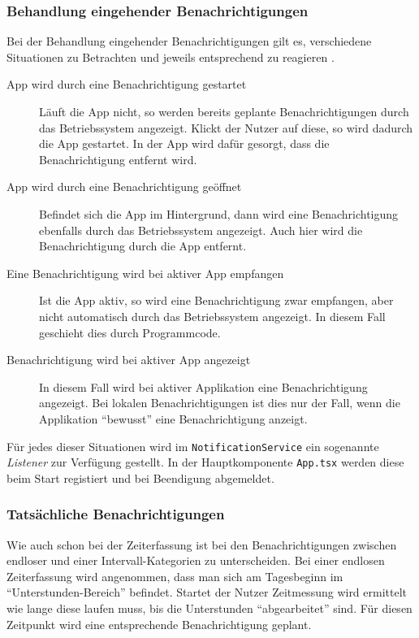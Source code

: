 \subsubsection{Behandlung eingehender Benachrichtigungen}
Bei der Behandlung eingehender Benachrichtigungen gilt es,
verschiedene Situationen zu Betrachten und jeweils entsprechend zu reagieren \cite{Introduc87:online}.
\begin{description}
    \item[App wird durch eine Benachrichtigung gestartet]
    Läuft die App nicht, so werden bereits geplante Benachrichtigungen durch das Betriebssystem angezeigt.
    Klickt der Nutzer auf diese, so wird dadurch die App gestartet.
    In der App wird dafür gesorgt, dass die Benachrichtigung entfernt wird.

    \item[App wird durch eine Benachrichtigung geöffnet]
    Befindet sich die App im Hintergrund,
    dann wird eine Benachrichtigung ebenfalls durch das Betriebssystem angezeigt.
    Auch hier wird die Benachrichtigung durch die App entfernt.

    \item[Eine Benachrichtigung wird bei aktiver App empfangen]
    Ist die App aktiv, so wird eine Benachrichtigung zwar empfangen,
    aber nicht automatisch durch das Betriebssystem angezeigt.
    In diesem Fall geschieht dies durch Programmcode.

    \item[Benachrichtigung wird bei aktiver App angezeigt]
    In diesem Fall wird bei aktiver Applikation eine Benachrichtigung angezeigt.
    Bei lokalen Benachrichtigungen ist dies nur der Fall,
    wenn die Applikation \enquote{bewusst} eine Benachrichtigung anzeigt.
\end{description}

\noindent
Für jedes dieser Situationen wird im \texttt{NotificationService} ein sogenannte \emph{Listener} zur Verfügung gestellt.
In der Hauptkomponente \texttt{App.tsx} werden diese beim Start registiert und bei Beendigung abgemeldet.

\subsubsection{Tatsächliche Benachrichtigungen}
Wie auch schon bei der Zeiterfassung ist bei den Benachrichtigungen zwischen endloser und einer Intervall-Kategorien zu unterscheiden.
Bei einer endlosen Zeiterfassung wird angenommen,
dass man sich am Tagesbeginn im \enquote{Unterstunden-Bereich} befindet.
Startet der Nutzer Zeitmessung wird ermittelt wie lange diese laufen muss,
bis die Unterstunden \enquote{abgearbeitet} sind.
Für diesen Zeitpunkt wird eine entsprechende Benachrichtigung geplant.

